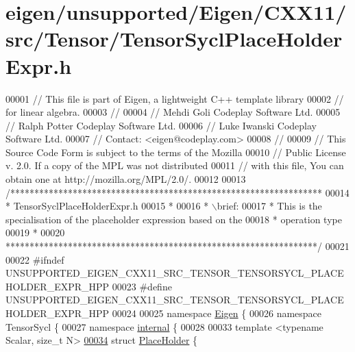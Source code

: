 \hypertarget{eigen_2unsupported_2_eigen_2_c_x_x11_2src_2_tensor_2_tensor_sycl_place_holder_expr_8h_source}{}\section{eigen/unsupported/\+Eigen/\+C\+X\+X11/src/\+Tensor/\+Tensor\+Sycl\+Place\+Holder\+Expr.h}
\label{eigen_2unsupported_2_eigen_2_c_x_x11_2src_2_tensor_2_tensor_sycl_place_holder_expr_8h_source}

\begin{DoxyCode}
00001 \textcolor{comment}{// This file is part of Eigen, a lightweight C++ template library}
00002 \textcolor{comment}{// for linear algebra.}
00003 \textcolor{comment}{//}
00004 \textcolor{comment}{// Mehdi Goli    Codeplay Software Ltd.}
00005 \textcolor{comment}{// Ralph Potter  Codeplay Software Ltd.}
00006 \textcolor{comment}{// Luke Iwanski  Codeplay Software Ltd.}
00007 \textcolor{comment}{// Contact: <eigen@codeplay.com>}
00008 \textcolor{comment}{//}
00009 \textcolor{comment}{// This Source Code Form is subject to the terms of the Mozilla}
00010 \textcolor{comment}{// Public License v. 2.0. If a copy of the MPL was not distributed}
00011 \textcolor{comment}{// with this file, You can obtain one at http://mozilla.org/MPL/2.0/.}
00012 
00013 \textcolor{comment}{/*****************************************************************}
00014 \textcolor{comment}{ * TensorSyclPlaceHolderExpr.h}
00015 \textcolor{comment}{ *}
00016 \textcolor{comment}{ * \(\backslash\)brief:}
00017 \textcolor{comment}{ *  This is the specialisation of the placeholder expression based on the}
00018 \textcolor{comment}{ * operation type}
00019 \textcolor{comment}{ *}
00020 \textcolor{comment}{*****************************************************************/}
00021 
00022 \textcolor{preprocessor}{#ifndef UNSUPPORTED\_EIGEN\_CXX11\_SRC\_TENSOR\_TENSORSYCL\_PLACEHOLDER\_EXPR\_HPP}
00023 \textcolor{preprocessor}{#define UNSUPPORTED\_EIGEN\_CXX11\_SRC\_TENSOR\_TENSORSYCL\_PLACEHOLDER\_EXPR\_HPP}
00024 
00025 \textcolor{keyword}{namespace }\hyperlink{namespace_eigen}{Eigen} \{
00026 \textcolor{keyword}{namespace }TensorSycl \{
00027 \textcolor{keyword}{namespace }\hyperlink{namespaceinternal}{internal} \{
00028 
00033 \textcolor{keyword}{template} <\textcolor{keyword}{typename} Scalar, \textcolor{keywordtype}{size\_t} N>
\hyperlink{struct_eigen_1_1_tensor_sycl_1_1internal_1_1_place_holder}{00034} \textcolor{keyword}{struct }\hyperlink{struct_eigen_1_1_tensor_sycl_1_1internal_1_1_place_holder}{PlaceHolder} \{

\end{DoxyCode}
